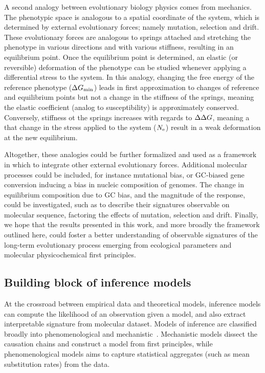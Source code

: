 A second analogy between evolutionary biology physics comes from mechanics.
The phenotypic space is analogous to a spatial coordinate of the system, which is determined by external evolutionary forces; namely mutation, selection and drift.
These evolutionary forces are analogous to springs attached and stretching the phenotype in various directions and with various stiffness, resulting in an equilibrium point.
Once the equilibrium point is determined, an elastic (or reversible) deformation of the phenotype can be studied whenever applying a differential stress to the system.
In this analogy, changing the free energy of the reference phenotype ($\Delta G_{\text{min}}$) leads in first approximation to changes of reference and equilibrium points but not a change in the stiffness of the springs, meaning the elastic coefficient (analog to susceptibility) is approximately conserved.
Conversely, stiffness ot the springs increases with regards to $\Delta \Delta G$, meaning a that change in the stress applied to the system ($N_{\text{e}}$) result in a weak deformation at the new equilibrium.

Altogether, these analogies could be further formalized and used as a framework in which to integrate other external evolutionary forces.
Additional molecular processes could be included, for instance mutational bias, or GC-biased gene conversion inducing a bias in nucleic composition of genomes.
The change in equilibrium composition due to GC bias, and the magnitude of the response, could be investigated, such as to describe their signatures observable on molecular sequence, factoring the effects of mutation, selection and drift.
Finally, we hope that the results presented in this work, and more broadly the framework outlined here, could foster a better understanding of observable signatures of the long-term evolutionary process emerging from ecological parameters and molecular physicochemical first principles.

\subsection{Building block of inference models}

At the crossroad between empirical data and theoretical models, inference models can compute the likelihood of an observation given a model, and also extract interpretable signature from molecular dataset.
Models of inference are classified broadly into phenomenological and mechanistic~\citep{Rodrigue2010a}.
Mechanistic models dissect the causation chains and construct a model from first principles, while phenomenological models aims to capture statistical aggregates (such as mean substitution rates) from the data.

